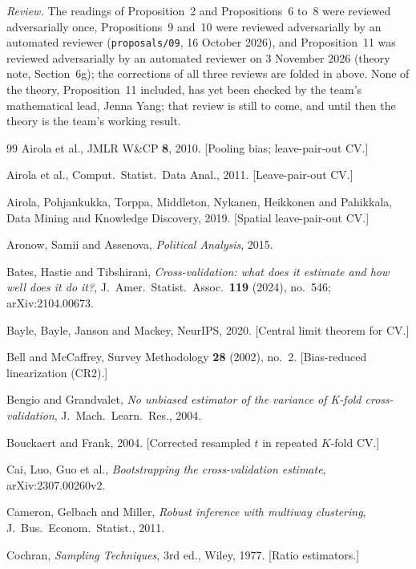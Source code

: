 \documentclass[11pt]{amsart}
\theoremstyle{plain}
\theoremstyle{definition}
\theoremstyle{remark}
\begin{document}
\emph{Review.} The readings of Proposition~2 and Propositions~6 to~8 were reviewed adversarially once, Propositions~9 and~10 were reviewed adversarially by an automated reviewer (\texttt{proposals/09}, 16 October 2026), and Proposition~11 was reviewed adversarially by an automated reviewer on 3 November 2026 (theory note, Section~6g); the corrections of all three reviews are folded in above. None of the theory, Proposition~11 included, has yet been checked by the team's mathematical lead, Jenna Yang; that review is still to come, and until then the theory is the team's working result.

\begin{thebibliography}{99}
\footnotesize
{} Airola et al., JMLR W\&CP \textbf{8}, 2010. [Pooling bias; leave-pair-out CV.]

 Airola et al., Comput.\ Statist.\ Data Anal., 2011. [Leave-pair-out CV.]

 Airola, Pohjankukka, Torppa, Middleton, Nykanen, Heikkonen and Pahikkala, Data Mining and Knowledge Discovery, 2019. [Spatial leave-pair-out CV.]

 Aronow, Samii and Assenova, \emph{Political Analysis}, 2015.

 Bates, Hastie and Tibshirani, \emph{Cross-validation: what does it estimate and how well does it do it?}, J.\ Amer.\ Statist.\ Assoc.\ \textbf{119} (2024), no.~546; arXiv:2104.00673.

 Bayle, Bayle, Janson and Mackey, NeurIPS, 2020. [Central limit theorem for CV.]

 Bell and McCaffrey, Survey Methodology \textbf{28} (2002), no.~2. [Bias-reduced linearization (CR2).]

 Bengio and Grandvalet, \emph{No unbiased estimator of the variance of K-fold cross-validation}, J.\ Mach.\ Learn.\ Res., 2004.

 Bouckaert and Frank, 2004. [Corrected resampled $t$ in repeated $K$-fold CV.]

 Cai, Luo, Guo et al., \emph{Bootstrapping the cross-validation estimate}, arXiv:2307.00260v2.

 Cameron, Gelbach and Miller, \emph{Robust inference with multiway clustering}, J.\ Bus.\ Econom.\ Statist., 2011.

 Cochran, \emph{Sampling Techniques}, 3rd ed., Wiley, 1977. [Ratio estimators.]


\end{thebibliography}
\end{document}
